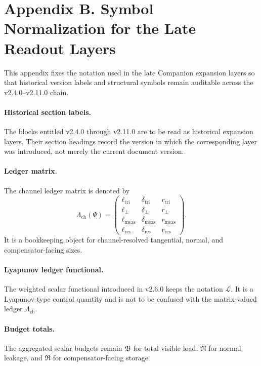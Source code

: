 \section*{Appendix B. Symbol Normalization for the Late Readout Layers}

This appendix fixes the notation used in the late Companion expansion layers so that
historical version labels and structural symbols remain auditable across the v2.4.0--v2.11.0
chain.

\paragraph{Historical section labels.}
The blocks entitled v2.4.0 through v2.11.0 are to be read as historical expansion
layers. Their section headings record the version in which the corresponding layer was
introduced, not merely the current document version.

\paragraph{Ledger matrix.}
The channel ledger matrix is denoted by
\[
\Lambda_{\mathrm{ch}}(\Psi)
=
\begin{pmatrix}
\ell_{\mathrm{tri}} & \delta_{\mathrm{tri}} & r_{\mathrm{tri}}\\
\ell_{\perp} & \delta_{\perp} & r_{\perp}\\
\ell_{\mathrm{meas}} & \delta_{\mathrm{meas}} & r_{\mathrm{meas}}\\
\ell_{\mathrm{res}} & \delta_{\mathrm{res}} & r_{\mathrm{res}}
\end{pmatrix}.
\]
It is a bookkeeping object for channel-resolved tangential, normal, and compensator-facing
sizes.

\paragraph{Lyapunov ledger functional.}
The weighted scalar functional introduced in v2.6.0 keeps the notation
\(\mathcal L\). It is a Lyapunov-type control quantity and is not to be confused with the
matrix-valued ledger \(\Lambda_{\mathrm{ch}}\).

\paragraph{Budget totals.}
The aggregated scalar budgets remain
\(\mathfrak B\) for total visible load, \(\mathfrak N\) for normal leakage, and
\(\mathfrak R\) for compensator-facing storage.

